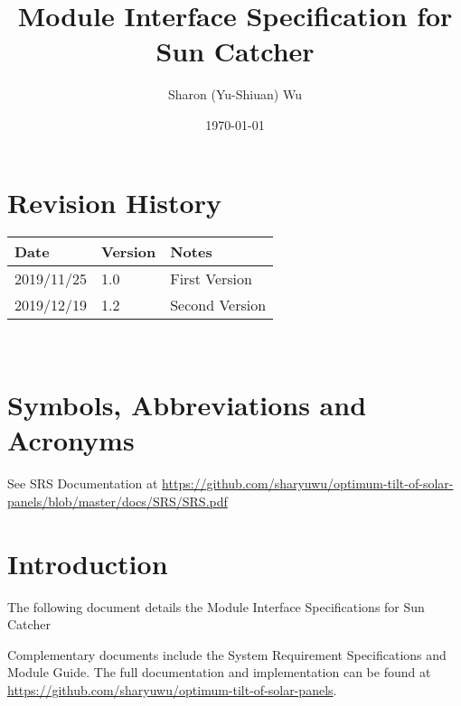 \documentclass[12pt, titlepage]{article}
\newcommand{\progname}{Sun Catcher}
\begin{document}
\title{Module Interface Specification for \progname}

\author{Sharon (Yu-Shiuan) Wu}

\date{\today}

\maketitle


\section{Revision History}

\begin{tabularx}{\textwidth}{p{3cm}p{2cm}X}
\toprule {\bf Date} & {\bf Version} & {\bf Notes}\\
\midrule
2019/11/25 & 1.0 & First Version\\
2019/12/19 & 1.2 & Second Version\\
\bottomrule
\end{tabularx}

~\newpage

\section{Symbols, Abbreviations and Acronyms}

See SRS Documentation at \url{https://github.com/sharyuwu/optimum-tilt-of-solar-panels/blob/master/docs/SRS/SRS.pdf}


\newpage

\tableofcontents

\newpage


\section{Introduction}

The following document details the Module Interface Specifications for \progname
{}

Complementary documents include the System Requirement Specifications
and Module Guide.  The full documentation and implementation can be
found at \url{https://github.com/sharyuwu/optimum-tilt-of-solar-panels}.  
\end{document}
